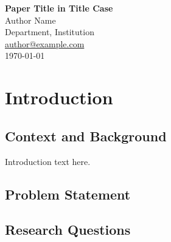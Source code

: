 \documentclass[12pt, a4paper]{article}
\newcommand{\keywords}[1]{\textit{Keywords}: #1}
\begin{document}
\begin{titlepage}
\begin{center}
\vspace*{2in}

{\LARGE \textbf{Paper Title in Title Case}} \\[0.5in]

{\large Author Name} \\[0.1in]
{\normalsize Department, Institution} \\[0.1in]
{\normalsize \href{mailto:author@example.com}{author@example.com}} \\[0.5in]

{\normalsize \today}

\end{center}
\end{titlepage}

\begin{abstract}
\noindent
Abstract text goes here. Include background, purpose, method, findings, and implications in a single paragraph without indent.

\vspace{6pt}
\noindent
\keywords{keyword1, keyword2, keyword3, keyword4, keyword5}
\end{abstract}

\newpage

\section{Introduction}

\subsection{Context and Background}
Introduction text here.

\subsection{Problem Statement}

\subsection{Research Questions}
\end{document}
